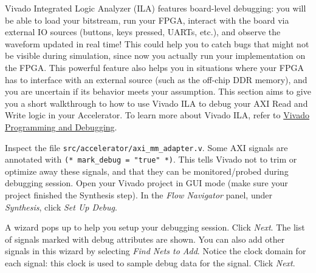 \documentclass[11pt]{article}
\begin{document}
Vivado Integrated Logic Analyzer (ILA) features board-level debugging: you will be able to load your bitstream, run your FPGA, interact with the board via external IO sources (buttons, keys pressed, UARTs, etc.), and observe the waveform updated in real time! This could help you to catch bugs that might not be visible during simulation, since now you actually run your implementation on the FPGA. This powerful feature also helps you in situations where your FPGA has to interface with an external source (such as the off-chip DDR memory), and you are uncertain if its behavior meets your assumption. This section aims to give you a short walkthrough to how to use Vivado ILA to debug your AXI Read and Write logic in your Accelerator. To learn more about Vivado ILA, refer to \href{https://www.xilinx.com/support/documentation/sw_manuals/xilinx2019_2/ug908-vivado-programming-debugging.pdf}{Vivado Programming and Debugging}.

Inspect the file \verb|src/accelerator/axi_mm_adapter.v|. Some AXI signals are annotated with \verb|(* mark_debug = "true" *)|. This tells Vivado not to trim or optimize away these signals, and that they can be monitored/probed during debugging session. Open your Vivado project in GUI mode (make sure your project finished the Synthesis step). In the \emph{Flow Navigator} panel, under \emph{Synthesis}, click \emph{Set Up Debug}.

\begin{center}
\end{center}

A wizard pops up to help you setup your debugging session. Click \emph{Next}. The list of signals marked with debug attributes are shown. You can also add other signals in this wizard by selecting \emph{Find Nets to Add}. Notice the clock domain for each signal: this clock is used to sample debug data for the signal. Click \emph{Next}.
\end{document}
